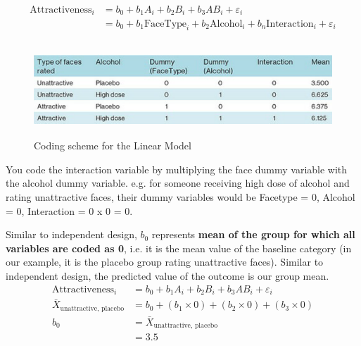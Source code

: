 \begin{equation}
\begin{split}
\text{Attractiveness}_i & = b_0 + b_1A_{i} + b_2B_{i} + b_3AB_{i} + \varepsilon_i \\
& = b_0 + b_1\text{FaceType}_{i} + b_2\text{Alcohol}_{i} + b_n\text{Interaction}_{i} + \varepsilon_i
\end{split}
\end{equation}

\begin{figure}[h]
	\includegraphics[width=1\textwidth,height=35mm]{Chapter 14 GLM 3 Factorial Designs/codingscheme.PNG}
	\caption{Coding scheme for the Linear Model}
\end{figure}

You code the interaction variable by multiplying the face dummy variable with the alcohol dummy variable. e.g. for someone receiving high dose of alcohol and rating unattractive faces, their dummy variables would be Facetype = 0, Alcohol = 0, Interaction = 0 x 0 = 0.

Similar to independent design,  $b_0$ represents \textbf{mean of the group for which all variables are coded as 0}, i.e. it is the mean value of the baseline category (in our example, it is the placebo group rating unattractive faces).
Similar to independent design, the predicted value of the outcome is our group mean.
\begin{equation}
\begin{split}
\text{Attractiveness}_i & = b_0 + b_1A_{i} + b_2B_{i} + b_3AB_{i} + \varepsilon_i \\
\bar{X}_{\text{unattractive, placebo}} & = b_0 + (b_1 \times 0) + (b_2 \times 0) + (b_3 \times 0) \\
b_0 & = \bar{X}_{\text{unattractive, placebo}} \\
& = 3.5
\end{split}
\end{equation}

